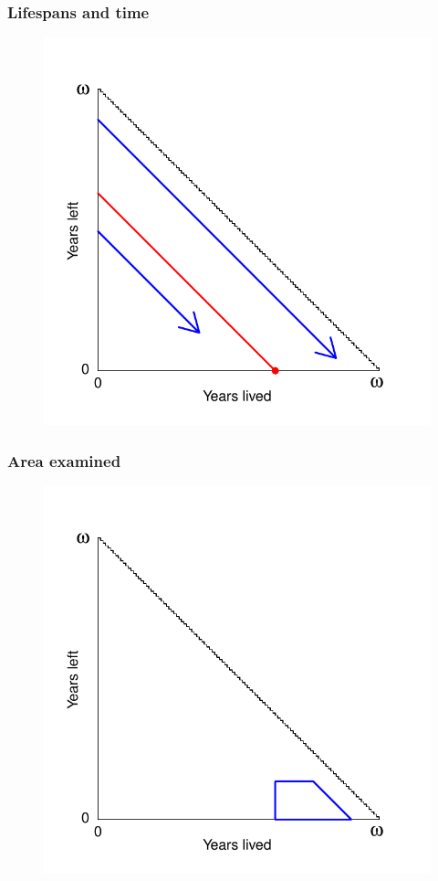 \documentclass{beamer}
\begin{document}
\begin{frame}
\frametitle{Lifespans and time}
\vspace{-1cm}
\begin{figure}
\includegraphics[scale=.7]{Figures/Triangle2}
\end{figure}
\end{frame}
\begin{frame}
\frametitle{Area examined}
\vspace{-1cm}
\begin{figure}
\includegraphics[scale=.7]{Figures/Triangle3}
\end{figure}
\end{frame}
\end{document}
